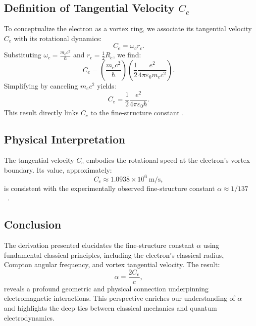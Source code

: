     \subsection*{Definition of Tangential Velocity $C_e$}
    To conceptualize the electron as a vortex ring, we associate its tangential velocity $C_e$ with its rotational dynamics:
    \begin{equation*}
        C_e = \omega_c r_c.
    \end{equation*}
    Substituting $\omega_c = \frac{m_e c^2}{\hbar}$ and $r_c = \frac{1}{2} R_e$, we find:
    \begin{equation*}
        C_e = \left( \frac{m_e c^2}{\hbar} \right) \left( \frac{1}{2} \frac{e^2}{4\pi \varepsilon_0 m_e c^2} \right).
    \end{equation*}
    Simplifying by canceling $m_e c^2$ yields:
    \begin{equation*}
        C_e = \frac{1}{2} \frac{e^2}{4\pi \varepsilon_0 \hbar}.\label{eq:C_e-from-compton}
    \end{equation*}
    This result directly links $C_e$ to the fine-structure constant \cite{vinen2024}.

    \subsection*{Physical Interpretation}
    The tangential velocity $C_e$ embodies the rotational speed at the electron's vortex boundary. Its value, approximately:
    \begin{equation*}
        C_e \approx 1.0938 \times 10^6 \ \text{m/s},
    \end{equation*}
    is consistent with the experimentally observed fine-structure constant $\alpha \approx 1/137$~\cite{ricca1998}.

    \subsection*{Conclusion}
    The derivation presented elucidates the fine-structure constant $\alpha$ using fundamental classical principles, including the electron's classical radius, Compton angular frequency, and vortex tangential velocity. The result:
    \begin{equation*}
        \alpha = \frac{2 C_e}{c},
    \end{equation*}
    reveals a profound geometric and physical connection underpinning electromagnetic interactions.
    This perspective enriches our understanding of $\alpha$ and highlights the deep ties between classical mechanics and quantum electrodynamics.


